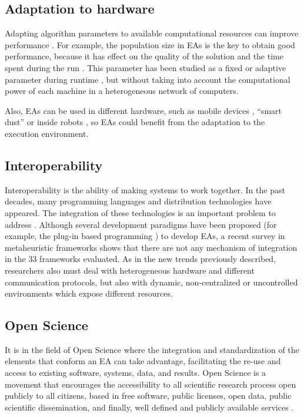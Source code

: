 \subsection{Adaptation to hardware}
Adapting algorithm parameters to available computational resources can improve performance \cite{AutomaticallyConfiguringStyles12}.  For example, the population size in EAs is the key to obtain good performance, because it has effect on the quality of the solution and the time spent during the run \cite{ShrinkageLaredo09}. This parameter has been studied as a fixed \cite{SizingHarik99} or adaptive parameter during runtime \cite{AdaptiveLobo07,SelfRegulatedSizeFernandes06}, but without taking into account the computational power of each machine in a heterogeneous network of computers. 

Also, EAs can be used in different hardware, such as mobile devices \cite{Garcia2009Mobile}, ``smart dust'' \cite{Rollings2008smartdust} or inside robots \cite{Garcia2012testing}, so EAs could benefit from the adaptation to the execution environment.


\subsection{Interoperability}
Interoperability is the ability of making systems to work together. In the past decades, many programming languages and distribution technologies have  appeared. The integration of these technologies is an important problem to address \cite{Papazoglou2007SOA}. Although several development paradigms have been proposed (for example, the plug-in based programming \cite{WagnerPlugins07}) to develop EAs, a recent survey in metaheuristic frameworks \cite{SURVEYMOFS} shows that there are not any mechanism of integration in the 33 frameworks evaluated. As in the new trends previously described, researchers also must deal  with heterogeneous hardware and different communication protocols, but also with dynamic, non-centralized or uncontrolled environments which expose different resources.

\subsection{Open Science}
It is in the field of Open Science \cite{Altunay2011OpenScience} where the integration and standardization of
the elements that conform an EA can take advantage, facilitating the re-use and access to existing software, systems, data, and results. Open Science is a movement that encourages the accessibility to all scientific research process open publicly to all citizens, based in free software, public licenses, open data, public scientific dissemination, and finally, well defined and publicly available services \cite{Foster2005Science}.



